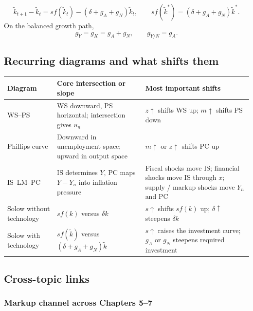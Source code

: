 \documentclass[12pt]{article}
\begin{document}
\begin{keyformula}[title={Key Formula: Solow with technology}]
\[
\tilde{k}_{t+1}-\tilde{k}_t=s f(\tilde{k}_t)-(\delta+g_A+g_N)\tilde{k}_t,
\qquad
s f(\tilde{k}^*)=(\delta+g_A+g_N)\tilde{k}^*.
\]
On the balanced growth path,
\[
g_Y=g_K=g_A+g_N,
\qquad
g_{Y/N}=g_A.
\]
\end{keyformula}

\subsection{Recurring diagrams and what shifts them}

\begin{center}
\renewcommand{\arraystretch}{1.2}
\begin{tabularx}{\textwidth}{|p{2.2cm}|p{3.1cm}|X|}
\hline
\textbf{Diagram} & \textbf{Core intersection or slope} & \textbf{Most important shifts} \\
\hline
WS--PS & WS downward, PS horizontal; intersection gives \(u_n\) & \(z\uparrow\) shifts WS up; \(m\uparrow\) shifts PS down \\
\hline
Phillips curve & Downward in unemployment space; upward in output space & \(m\uparrow\) or \(z\uparrow\) shifts PC up \\
\hline
IS--LM--PC & IS determines \(Y\), PC maps \(Y-Y_n\) into inflation pressure & Fiscal shocks move IS; financial shocks move IS through \(x\); supply / markup shocks move \(Y_n\) and PC \\
\hline
Solow without technology & \(sf(k)\) versus \(\delta k\) & \(s\uparrow\) shifts \(sf(k)\) up; \(\delta\uparrow\) steepens \(\delta k\) \\
\hline
Solow with technology & \(sf(\tilde{k})\) versus \((\delta+g_A+g_N)\tilde{k}\) & \(s\uparrow\) raises the investment curve; \(g_A\) or \(g_N\) steepens required investment \\
\hline
\end{tabularx}
\end{center}

\subsection{Cross-topic links}

\subsubsection*{Markup channel across Chapters 5--7}
\end{document}
